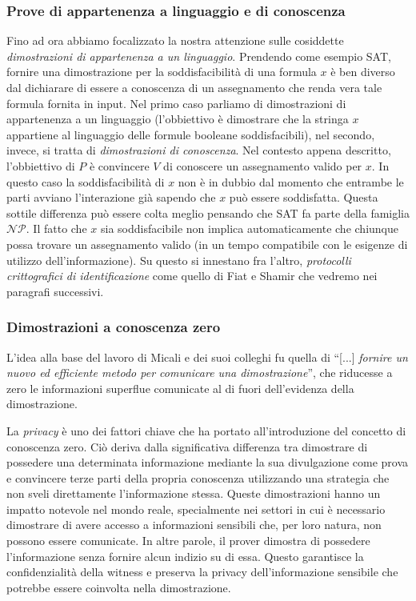 \documentclass{article}
\theoremstyle{definition}
\begin{document}
\subsubsection{Prove di appartenenza a linguaggio e di conoscenza}
Fino ad ora abbiamo focalizzato la nostra attenzione sulle cosiddette \emph{dimostrazioni di appartenenza a un linguaggio}.
Prendendo come esempio SAT, fornire una dimostrazione per la soddisfacibilità di una formula $x$ è ben diverso dal dichiarare di essere a conoscenza di un assegnamento che renda vera tale formula fornita in input. Nel primo caso parliamo di dimostrazioni di appartenenza a un linguaggio (l'obbiettivo è dimostrare che la stringa $x$ appartiene al linguaggio delle formule booleane soddisfacibili), nel secondo, invece, si tratta di \emph{dimostrazioni di conoscenza}.
Nel contesto appena descritto, l'obbiettivo di $P$ è convincere $V$ di conoscere un assegnamento valido per $x$. In questo caso la soddisfacibilità di $x$ non è in dubbio dal momento che entrambe le parti avviano l'interazione già sapendo che $x$ può essere soddisfatta.
Questa sottile differenza può essere colta meglio pensando che SAT fa parte della famiglia \texttt{$\mathcal{NP}$}. Il fatto che $x$ sia soddisfacibile non implica automaticamente che chiunque possa trovare un assegnamento valido (in un tempo compatibile con le esigenze di utilizzo dell'informazione). Su questo si innestano fra l'altro, \emph{protocolli crittografici di identificazione} come quello di Fiat e Shamir che vedremo nei paragrafi successivi.



\subsubsection{Dimostrazioni a conoscenza zero}\label{zk}
L'idea alla base del lavoro di Micali e dei suoi colleghi fu quella di ``[...] \emph{fornire un nuovo ed efficiente metodo per comunicare una dimostrazione}''\cite[p. 291]{micali}, che riducesse a zero le informazioni superflue comunicate al di fuori dell'evidenza della dimostrazione.


La \emph{privacy} è uno dei fattori chiave che ha portato all'introduzione del concetto di conoscenza zero. Ciò deriva dalla significativa differenza tra dimostrare di possedere una determinata informazione mediante la sua divulgazione come prova e convincere terze parti della propria conoscenza utilizzando una strategia che non sveli direttamente l'informazione stessa. Queste dimostrazioni hanno un impatto notevole nel mondo reale, specialmente nei settori in cui è necessario dimostrare di avere accesso a informazioni sensibili che, per loro natura, non possono essere comunicate.
In altre parole, il prover dimostra di possedere l'informazione senza fornire alcun indizio su di essa. Questo garantisce la confidenzialità della witness e preserva la privacy dell'informazione sensibile che potrebbe essere coinvolta nella dimostrazione.
\end{document}
